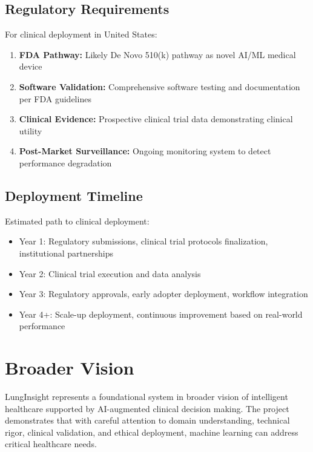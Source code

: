 {\subsection{Regulatory Requirements}

For clinical deployment in United States:

\begin{enumerate}
    \item \textbf{FDA Pathway:} Likely De Novo 510(k) pathway as novel AI/ML medical device
    \item \textbf{Software Validation:} Comprehensive software testing and documentation per FDA guidelines
    \item \textbf{Clinical Evidence:} Prospective clinical trial data demonstrating clinical utility
    \item \textbf{Post-Market Surveillance:} Ongoing monitoring system to detect performance degradation
\end{enumerate}

\subsection{Deployment Timeline}

Estimated path to clinical deployment:

\begin{itemize}
    \item Year 1: Regulatory submissions, clinical trial protocols finalization, institutional partnerships
    \item Year 2: Clinical trial execution and data analysis
    \item Year 3: Regulatory approvals, early adopter deployment, workflow integration
    \item Year 4+: Scale-up deployment, continuous improvement based on real-world performance
\end{itemize}

\section{Broader Vision}

LungInsight represents a foundational system in broader vision of intelligent healthcare supported by AI-augmented clinical decision making. The project demonstrates that with careful attention to domain understanding, technical rigor, clinical validation, and ethical deployment, machine learning can address critical healthcare needs.

}
